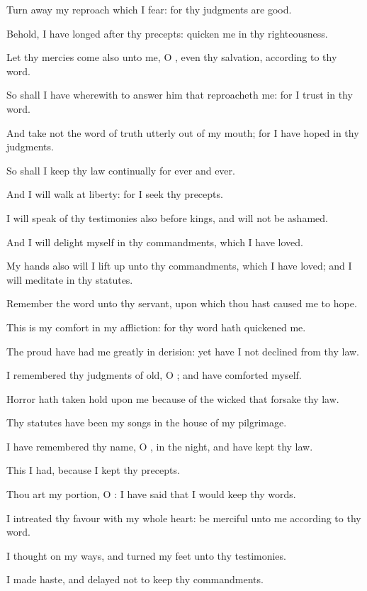 \verse Turn away my reproach which I fear: for thy judgments are good.

\verse Behold, I have longed after thy precepts: quicken me in thy righteousness.

\verse Let thy mercies come also unto me, O \LORD, even thy salvation, according to thy word.

\verse So shall I have wherewith to answer him that reproacheth me: for I trust in thy word.

\verse And take not the word of truth utterly out of my mouth; for I have hoped in thy judgments.

\verse So shall I keep thy law continually for ever and ever.

\verse And I will walk at liberty: for I seek thy precepts.

\verse I will speak of thy testimonies also before kings, and will not be ashamed.

\verse And I will delight myself in thy commandments, which I have loved.

\verse My hands also will I lift up unto thy commandments, which I have loved; and I will meditate in thy statutes.

\verse Remember the word unto thy servant, upon which thou hast caused me to hope.

\verse This is my comfort in my affliction: for thy word hath quickened me.

\verse The proud have had me greatly in derision: yet have I not declined from thy law.

\verse I remembered thy judgments of old, O \LORD; and have comforted myself.

\verse Horror hath taken hold upon me because of the wicked that forsake thy law.

\verse Thy statutes have been my songs in the house of my pilgrimage.

\verse I have remembered thy name, O \LORD, in the night, and have kept thy law.

\verse This I had, because I kept thy precepts.

\verse Thou art my portion, O \LORD: I have said that I would keep thy words.

\verse I intreated thy favour with my whole heart: be merciful unto me according to thy word.

\verse I thought on my ways, and turned my feet unto thy testimonies.

\verse I made haste, and delayed not to keep thy commandments.

